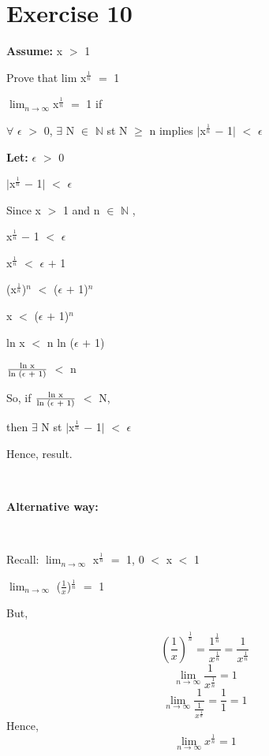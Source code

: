 \documentclass{article}
\newcommand{\mt}[1]{\ensuremath{#1}}
\newcommand\bsc[2][\DefaultOpt]{%
  \def\DefaultOpt{#2}%
  \section[#1]{#2}%
}
\newcommand{\lt}[1]{\textbf{Let: } #1}
\newcommand{\as}[1]{\textbf{Assume: } #1}
\newcommand{\bn}{\mt{\mathbb{N}} }       %
\newcommand{\ep}{\mt{\epsilon} }         %
\newcommand{\fa}{\mt{\forall} }          %
\newcommand{\mem}{\mt{\in} }
\newcommand{\exs}{\mt{\exists} }
\newcommand{\av}[1]{\mt{|}#1\mt{|}}  %
\newcommand{\prn}[1]{(#1)}
\newcommand{\ps}{\mt{+} }
\newcommand{\ms}{\mt{-} }
\newcommand{\ls}{\mt{<} }
\newcommand{\gr}{\mt{>} }
\newcommand{\gre}{\mt{\geq} }
\newcommand{\eql}{\mt{=} }
\newcommand{\uf}[2]{#1\mt{^{#2}}}
\newcommand{\frc}[2]{\mt{\frac{#1}{#2}}}
\newcommand{\lmti}[1]{\mt{\displaystyle{\lim_{#1 \to \infty}}}}
\newcommand{\eqn}[1]{\[#1\]}
\begin{document}
\bsc{Exercise 10}{

\as{x \gr 1}

Prove that lim \uf{x}{\frc{1}{n}} \eql 1

\lmti{n}\uf{x}{\frc{1}{n}} \eql 1 if

\fa \ep \gr 0, \exs N \mem \bn st N \gre n implies \av{\uf{x}{\frc{1}{n}} \ms 1} \ls \ep

\lt{\ep \gr 0}

\av{\uf{x}{\frc{1}{n}} \ms 1} \ls \ep

Since x \gr 1 and n \mem \bn,

\uf{x}{\frc{1}{n}} \ms 1 \ls \ep

\uf{x}{\frc{1}{n}} \ls \ep \ps 1

(\uf{x}{\frc{1}{n}})$^n$ \ls (\ep \ps 1)$^n$

x \ls (\ep \ps 1)$^n$

ln x \ls n ln (\ep \ps 1)

\frc{\textrm{ln x}}{\textrm{ln (\ep + 1)}} \ls n

So, if \frc{\textrm{ln x}}{\textrm{ln (\ep + 1)}} \ls N,

then \exs N st \av{\uf{x}{\frc{1}{n}} \ms 1} \ls \ep

Hence, result.

\

\textbf{Alternative way:}

\

Recall: \lmti{n} \uf{x}{\frc{1}{n}} \eql 1, 0 \ls x \ls 1

\lmti{n} \prn{\frc{1}{x}}$^{\frac{1}{n}}$ \eql 1

But,

\eqn{(\frac{1}{x})^\frac{1}{n} = \frac{1^\frac{1}{n}}{x^{\frac{1}{n}}} = \frac{1}{x^\frac{1}{n}}}
\eqn{\lmti{n}\frac{1}{x^{\frac{1}{n}}} = 1}
\eqn{\lmti{n} \frac{1}{\frac{1}{x^\frac{1}{n}}} = \frac{1}{1} = 1}
Hence,
\eqn{\lmti{n} x^\frac{1}{n} = 1}
}
\end{document}
